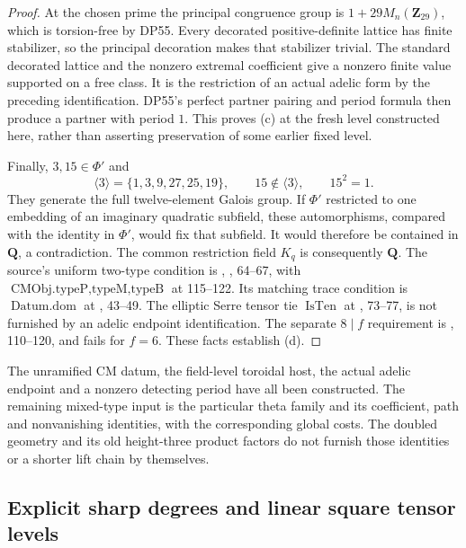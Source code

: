 \documentclass[11pt,a4paper]{article}
\theoremstyle{definition}\newtheorem{remark}[theorem]{Remark}
\begin{document}
\begin{proof}
At the chosen prime the principal congruence group is
$1+29M_n(\mathbf Z_{29})$, which is torsion-free by DP55.
Every decorated positive-definite lattice has finite stabilizer,
so the principal decoration makes that stabilizer trivial.
The standard decorated lattice and the nonzero extremal coefficient
give a nonzero finite value supported on a free class.
It is the restriction of an actual adelic form by the preceding
identification. DP55's perfect partner pairing and period formula
then produce a partner with period $1$.
This proves (c) at the fresh level constructed here, rather than
asserting preservation of some earlier fixed level.

Finally, $3,15\in\Phi'$ and
\[
 \langle3\rangle=\{1,3,9,27,25,19\},\qquad
 15\notin\langle3\rangle,\qquad15^2=1.
\]
They generate the full twelve-element Galois group.
If $\Phi'$ restricted to one embedding of an imaginary quadratic
subfield, these automorphisms, compared with the identity in
$\Phi'$, would fix that subfield. It would therefore be contained
in $\mathbf Q$, a contradiction. The common restriction field
$K_q$ is consequently $\mathbf Q$.
The source's uniform two-type condition is
,
, 64--67, with
$\operatorname{CMObj.typeP,typeM,typeB}$ at 115--122.
Its matching trace condition is $\operatorname{Datum.dom}$ at
, 43--49.
The elliptic Serre tensor tie $\operatorname{IsTen}$ at
, 73--77, is not furnished by an adelic
endpoint identification.
The separate $8\mid f$ requirement is
, 110--120,
and fails for $f=6$.
These facts establish (d).
\end{proof}

The unramified CM datum, the field-level toroidal host, the actual
adelic endpoint and a nonzero detecting period have all been constructed.
The remaining mixed-type input is the particular theta family and its
coefficient, path and nonvanishing identities, with the corresponding
global costs. The doubled geometry and its old height-three product
factors do not furnish those identities or a shorter lift chain by
themselves.


\subsection{Explicit sharp degrees and linear square tensor levels}
\end{document}
